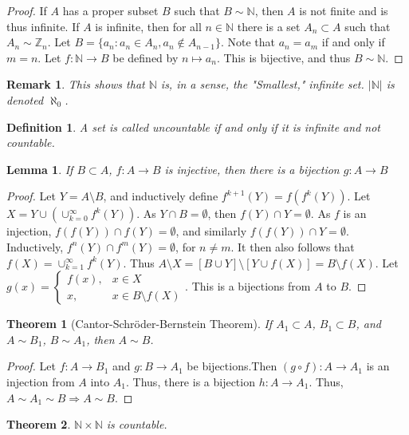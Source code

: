 \documentclass[crop=false,class=book]{standalone}
\theoremstyle{mystyle}
\newtheorem{theorem}{Theorem}[section]
\newtheorem{definition}{Definition}[section]
\newtheorem{lemma}{Lemma}[section]
\newtheorem{remark}{Remark}[section]
\begin{document}
\begin{proof}
If $A$ has a proper subset $B$ such that $B\sim \mathbb{N}$, then $A$ is not finite and is thus infinite. If $A$ is infinite, then for all $n\in \mathbb{N}$ there is a set $A_n\subset A$ such that $A_n \sim \mathbb{Z}_n$. Let $B = \{a_n: a_n \in A_n, a_n \notin A_{n-1}\}$. Note that $a_{n} = a_{m}$ if and only if $m= n$. Let $f:\mathbb{N} \rightarrow B$ be defined by $n\mapsto a_n$. This is bijective, and thus $B\sim \mathbb{N}$.
\end{proof}
\begin{remark}
This shows that $\mathbb{N}$ is, in a sense, the "Smallest," infinite set. $|\mathbb{N}|$ is denoted $\aleph_0$.
\end{remark}
\begin{definition}
A set is called uncountable if and only if it is infinite and not countable.
\end{definition}
\begin{lemma}
If $B\subset A$, $f:A\rightarrow B$ is injective, then there is a bijection $g:A\rightarrow B$
\end{lemma}
\begin{proof}
Let $Y = A\setminus B$, and inductively define $f^{k+1}(Y) = f(f^{k}(Y))$. Let $X = Y\cup (\cup_{k=0}^{\infty} f^{k}(Y))$. As $Y\cap B = \emptyset$, then $f(Y)\cap Y= \emptyset$. As $f$ is an injection, $f(f(Y))\cap f(Y)=\emptyset$, and similarly $f(f(Y))\cap Y = \emptyset$. Inductively, $f^{n}(Y)\cap f^{m}(Y) = \emptyset$, for $n\ne m$. It then also follows that $f(X) = \cup_{k=1}^{\infty} f^{k}(Y)$. Thus $A\setminus X = [B\cup Y]\setminus [Y\cup f(X)] = B\setminus f(X)$. Let $g(x) = \begin{cases} f(x), & x\in X \\ x, & x \in B\setminus f(X)\end{cases}$. This is a bijections from $A$ to $B$.
\end{proof}
\begin{theorem}[Cantor-Schr\"{o}der-Bernstein Theorem]
If $A_1 \subset A$, $B_1 \subset B$, and $A\sim B_1$, $B \sim A_1$, then $A\sim B$.
\end{theorem}
\begin{proof}
Let $f:A\rightarrow B_1$ and $g:B\rightarrow A_1$ be bijections.Then $(g\circ f):A\rightarrow A_1$ is an injection from $A$ into $A_1$. Thus, there is a bijection $h:A\rightarrow A_1$. Thus, $A\sim A_1 \sim B\Rightarrow A\sim B$.
\end{proof}
\begin{theorem}
$\mathbb{N}\times \mathbb{N}$ is countable.
\end{theorem}
\end{document}
